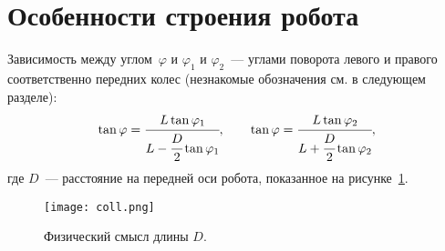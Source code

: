 \newpage
\section{Особенности строения робота}
Зависимость между углом~$\varphi$ и $\varphi_1$ и $\varphi_2$~--- углами поворота левого и правого соответственно передних колес (незнакомые обозначения см. в следующем разделе):
\begin{equation}
\tan\varphi = \cfrac{L \tan\varphi_1}{L - \cfrac{D}{2}\tan\varphi_1},
\qquad
\tan\varphi = \cfrac{L \tan\varphi_2}{L + \cfrac{D}{2}\tan\varphi_2},
\end{equation}
где $D$~--- расстояние на передней оси робота, показанное на рисунке~\ref{img_coll}.
\begin{figure}[h]
    \centering
    \texttt{[image: coll.png]}
    \caption{Физический смысл длины $D$.}
    \label{img_coll}
\end{figure}
